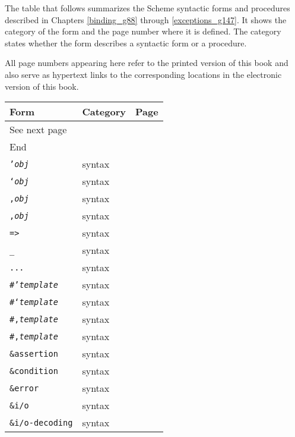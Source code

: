 
\label{summary_h0}




The table that follows summarizes the Scheme syntactic forms and
procedures described in Chapters \ref{binding_g88} through \ref{exceptions_g147}.
It shows the category of the form and the page number where it
is defined.
The category states whether the form describes a syntactic form or
a procedure.


All page numbers appearing here refer to the printed version of this
book and also serve as hypertext links to the corresponding locations
in the electronic version of this book.

\begin{longtabu} to \textwidth {Llr}\toprule
Form & Category & Page \\\midrule\endhead
\midrule{}See next page & & \\\bottomrule\endfoot
\midrule{}End & & \\\bottomrule\endlastfoot
\texttt{'\textit{obj}} & syntax & \pageref{objects_s2} \\
\texttt{`\textit{obj}} & syntax & \pageref{objects_s5} \\
\texttt{,\textit{obj}} & syntax & \pageref{objects_s5} \\
\texttt{,\@{}\textit{obj}} & syntax & \pageref{objects_s5} \\
\texttt{=\textgreater{}} & syntax & \pageref{control_s16} \\
\texttt{\_{}} & syntax & \pageref{syntax_s26} \\
\texttt{...} & syntax & \pageref{syntax_s26} \\
\texttt{\#{}'\textit{template}} & syntax & \pageref{syntax_s33} \\
\texttt{\#{}`\textit{template}} & syntax & \pageref{syntax_s40} \\
\texttt{\#{},\textit{template}} & syntax & \pageref{syntax_s40} \\
\texttt{\#{},\@{}\textit{template}} & syntax & \pageref{syntax_s40} \\
\texttt{\&{}assertion} & syntax & \pageref{exceptions_s21} \\
\texttt{\&{}condition} & syntax & \pageref{exceptions_s13} \\
\texttt{\&{}error} & syntax & \pageref{exceptions_s22} \\
\texttt{\&{}i/o} & syntax & \pageref{exceptions_s32} \\
\texttt{\&{}i/o-decoding} & syntax & \pageref{exceptions_s42} \\

\end{longtabu}
